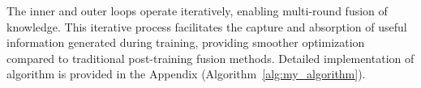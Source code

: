 The inner and outer loops operate iteratively, enabling multi-round fusion of knowledge. This iterative process facilitates the capture and absorption of useful information generated during training, providing smoother optimization compared to traditional post-training fusion methods.
Detailed implementation of {\ouralg} algorithm is provided in the Appendix (Algorithm~\ref{alg:my_algorithm}).



